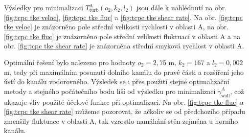 Výsledky pro minimalizaci $ T^{\text{A}}_{\text{turb}} (o_2, k_2, l_2) $ jsou dále k nahlédnutí na obr.  \ref{fig:tcpc tke veloc}, \ref{fig:tcpc tke fluc} a \ref{fig:tcpc tke shear rate}. Na obr. \ref{fig:tcpc tke veloc} je znázorněno pole střední velikosti rychlosti v oblasti A, na obr. \ref{fig:tcpc tke fluc} je znázorněno pole střední velikosti fluktuací v oblasti A a na obr. \ref{fig:tcpc tke shear rate} je znázorněna střední smyková rychlost v oblasti A.

Optimální řešení bylo nalezeno pro hodnoty $ o_2 = 2{,}75 $ m, $ k_2 = 167 $ a $ l_2 = 0{,}002 $ m, tedy při maximálním posunutí dolního kanálu do pravé části a rozšíření jeho ústí do kanálu vodorovného. Výsledek se i přes použití stejné optimalizační metody a stejného počátečního bodu liší od výsledku pro minimalizaci  $ \dot{\gamma} ^{A}_{\text{wall}} $, což ukazuje vliv použité účelové funkce při optimalizaci. Na obr. \ref{fig:tcpc tke fluc} a \ref{fig:tcpc tke shear rate} můžeme pozorovat, že ačkoliv se od předchozího případu zmenšily fluktuace v oblasti A, tak vzrostlo namáhání stěn zejména u horního kanálu. 

